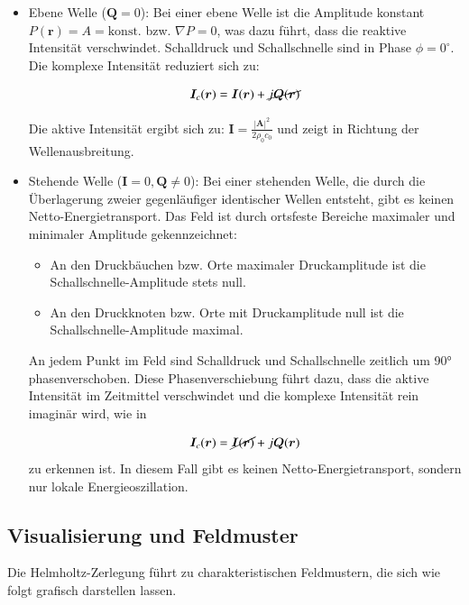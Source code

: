 \begin{itemize}


 
\item Ebene Welle ($\boldsymbol{Q} = 0$):
Bei einer ebene Welle ist die Amplitude konstant $P(\boldsymbol{r})
= A = \text{konst.}$ bzw. $\nabla P = 0$, was dazu führt, dass die
reaktive Intensität verschwindet. Schalldruck und Schallschnelle
sind in Phase $\phi = 0^{\circ}$. Die komplexe Intensität reduziert
sich zu:
 
\begin{equation}
\boldsymbol{I}_c (\boldsymbol{r})
=
\boldsymbol{I}(\boldsymbol{r}) + \cancel{j\boldsymbol{Q}(\boldsymbol{r})}
\end{equation}
 
Die aktive Intensität ergibt sich zu: $\boldsymbol{I} = \frac{|\boldsymbol{A}|^2}{2 \rho_0 c_0}$ und zeigt in Richtung der Wellenausbreitung.
 
\item Stehende Welle ($\boldsymbol{I} = 0, \boldsymbol{Q} \neq 0$): Bei einer stehenden Welle, die durch die Überlagerung zweier gegenläufiger identischer Wellen entsteht, gibt es keinen Netto-Energietransport. Das Feld ist durch ortsfeste Bereiche maximaler und minimaler Amplitude gekennzeichnet:
    \begin{itemize}
        \item An den Druckbäuchen bzw. Orte maximaler Druckamplitude ist die Schallschnelle-Amplitude stets null.
        \item An den Druckknoten bzw. Orte mit Druckamplitude null ist die Schallschnelle-Amplitude maximal.
    \end{itemize}
An jedem Punkt im Feld sind Schalldruck und Schallschnelle zeitlich um 90° phasenverschoben. Diese Phasenverschiebung führt dazu, dass die aktive Intensität im Zeitmittel verschwindet und die komplexe Intensität rein imaginär wird, wie in 
 
\begin{equation}
\boldsymbol{I}_c (\boldsymbol{r})
=
\cancel{\boldsymbol{I}(\boldsymbol{r})} + j\boldsymbol{Q}(\boldsymbol{r})
\end{equation}
zu erkennen ist. In diesem Fall gibt es keinen Netto-Energietransport, sondern nur lokale Energieoszillation.
\end{itemize}



\subsection{Visualisierung und Feldmuster
\label{helmholtz:subsection:Visualisierung}}
Die Helmholtz-Zerlegung führt zu charakteristischen Feldmustern, die sich wie folgt grafisch darstellen lassen.
 
